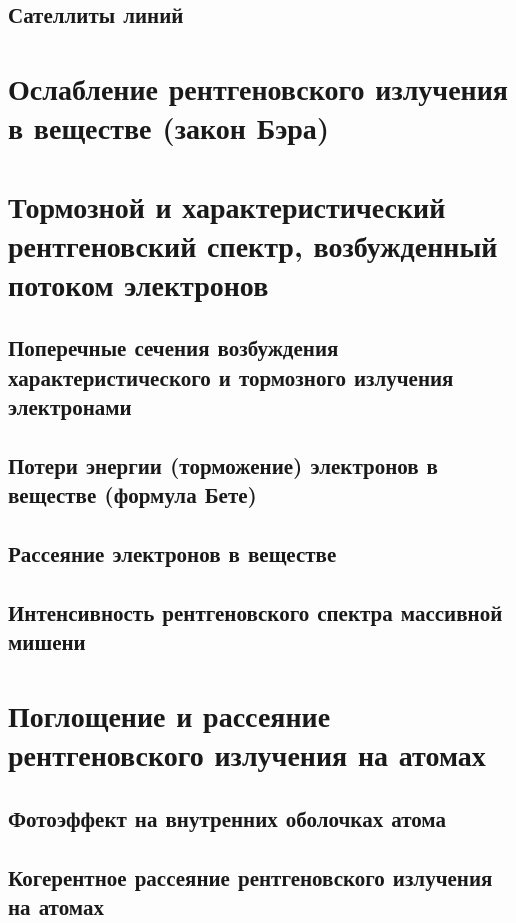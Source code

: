 \documentclass[a4paper,14pt, openany, twoside, draft]{extbook} %
\begin{document}
\section{Сателлиты линий}
\label{sec:sattelit-lines}

\chapter{Ослабление рентгеновского излучения в веществе (закон Бэра)}
\label{cha:}

\chapter{Тормозной и характеристический рентгеновский спектр, возбужденный потоком электронов}
\label{cha:torm-spec}

\section{Поперечные сечения возбуждения характеристического и тормозного излучения электронами}
\label{sec:sections}

\section{Потери энергии (торможение) электронов в веществе (формула Бете)}
\section{Рассеяние электронов в веществе}
\section{Интенсивность рентгеновского спектра массивной мишени}

\chapter{Поглощение и рассеяние рентгеновского излучения на атомах}
\label{cha:absorbtion}

\section{Фотоэффект на внутренних оболочках атома}
\section{Когерентное рассеяние рентгеновского излучения на атомах}
\end{document}
